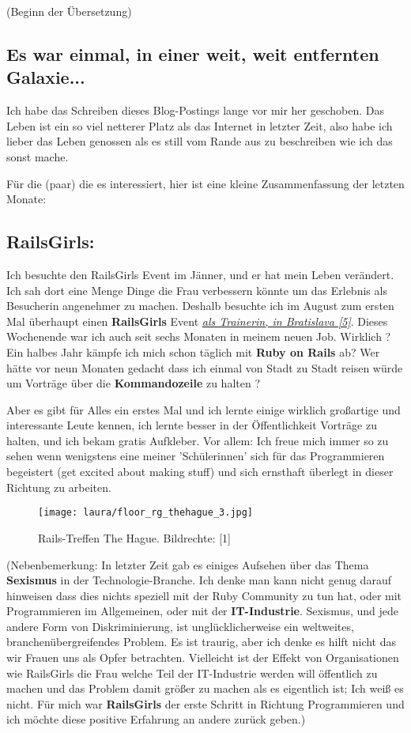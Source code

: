 \documentclass[10pt,a4paper,ngerman,twoside]{article} %
\begin{document}
(Beginn der Übersetzung) \\

\subsection*{Es war einmal, in einer weit, weit entfernten Galaxie...}

Ich habe das Schreiben dieses Blog-Postings lange vor mir her geschoben. Das Leben ist ein so viel netterer Platz als das Internet in letzter Zeit, also habe ich lieber das Leben genossen als es still vom Rande aus zu beschreiben wie ich das sonst mache.

Für die (paar) die es interessiert, hier ist eine kleine Zusammenfassung der letzten Monate:

\subsection*{RailsGirls:}

Ich besuchte den RailsGirls Event im Jänner, und er hat mein Leben verändert. Ich sah dort eine Menge Dinge die Frau verbessern könnte um das Erlebnis als Besucherin angenehmer zu machen. Deshalb besuchte ich im August zum ersten Mal überhaupt einen \textbf{RailsGirls} Event \href{http://railsgirls.com/bratislava}{\textit{als Trainerin, in Bratislava [5]}}. Dieses Wochenende war ich auch seit sechs Monaten in meinem neuen Job. Wirklich ? Ein halbes Jahr kämpfe ich mich schon täglich mit \textbf{Ruby on Rails} ab? Wer hätte vor neun Monaten gedacht dass ich einmal von Stadt zu Stadt reisen würde um Vorträge über die \textbf{Kommandozeile} zu halten ? 

Aber es gibt für Alles ein erstes Mal und ich lernte einige wirklich großartige und interessante Leute kennen, ich lernte besser in der Öffentlichkeit Vorträge zu halten, und ich bekam gratis Aufkleber. Vor allem: Ich freue mich immer so zu sehen wenn wenigstens eine meiner 'Schülerinnen' sich für das Programmieren begeistert (get excited about making stuff) und sich ernsthaft überlegt in dieser Richtung zu arbeiten.   

\begin{figure}
\texttt{[image: laura/floor\_rg\_thehague\_3.jpg]}
\caption{Rails-Treffen The Hague. Bildrechte: [1]}
\end{figure}


(Nebenbemerkung: In letzter Zeit gab es einiges Aufsehen über das Thema \textbf{Sexismus} in der Technologie-Branche. Ich denke man kann nicht genug darauf hinweisen dass dies nichts speziell mit der Ruby Community zu tun hat, oder mit Programmieren im Allgemeinen, oder mit der \textbf{IT-Industrie}. Sexismus, und jede andere Form von Diskriminierung, ist unglücklicherweise ein weltweites, branchenübergreifendes Problem. Es ist traurig, aber ich denke es hilft nicht das wir Frauen uns als Opfer betrachten. Vielleicht ist der Effekt von Organisationen wie RailsGirls die Frau welche Teil der IT-Industrie werden will öffentlich zu machen und das Problem damit größer zu machen als es eigentlich ist; Ich weiß es nicht. Für mich war \textbf{RailsGirls} der erste Schritt in Richtung Programmieren und ich möchte diese positive Erfahrung an andere zurück geben.)
\end{document}
